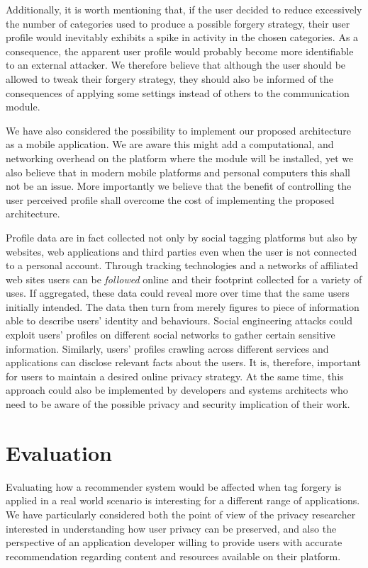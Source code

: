 Additionally, it is worth mentioning that, if the user decided to reduce excessively the number of categories used to produce a possible forgery strategy, their user profile would inevitably exhibits a spike in activity in the chosen categories. As a consequence, the apparent user profile would probably become more identifiable to an external attacker. We therefore believe that although the user should be allowed to tweak their forgery strategy, they should also be informed of the consequences of applying some settings instead of others to the communication module.

We have also considered the possibility to implement our proposed architecture as a mobile application. We are aware this might add a computational, and networking overhead on the platform where the module will be installed, yet we also believe that in modern mobile platforms and personal computers this shall not be an issue. More importantly we believe that the benefit of controlling the user perceived profile shall overcome the cost of implementing the proposed architecture.

Profile data are in fact collected not only by social tagging platforms but also by websites, web applications and third parties even when the user is not connected to a personal account. Through tracking technologies and a networks of affiliated web sites users can be \emph{followed} online and their footprint collected for a variety of uses.
If aggregated, these data could reveal more over time that the same users initially intended. The data then turn from merely figures to piece of information able to describe users' identity and behaviours. Social engineering attacks could exploit users' profiles on different social networks to gather certain sensitive information. Similarly, users' profiles crawling across different services and applications can disclose relevant facts about the users. It is, therefore, important for users to maintain a desired online privacy strategy. At the same time, this approach could also be implemented by developers and systems architects who need to be aware of the possible privacy and security implication of their work.

\section{Evaluation}
\label{sec:evaluation}
\noindent
Evaluating how a recommender system would be affected when tag forgery is applied in a real world scenario is interesting for a different range of applications. We have particularly considered both the point of view of the privacy researcher interested in understanding how user privacy can be preserved, and also the perspective of an application developer willing to provide users with accurate recommendation regarding content and resources available on their platform.

